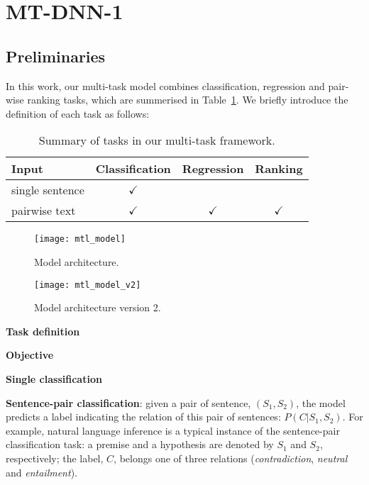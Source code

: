 \section{MT-DNN-1}
\label{sec:mt-dnn-1}

\subsection{Preliminaries}
\label{subsec:prelim}
In this work, our multi-task model combines classification, regression and pair-wise ranking tasks, which are summerised in Table~\ref{tab:task}. We briefly introduce the definition of each task as follows: 
\begin{table}[htb!]
	\begin{center}
		\begin{tabular}{@{\hskip1pt}l@{\hskip1pt}|@{\hskip1pt}c@{\hskip1pt}|@{\hskip1pt}c@{\hskip1pt}|@{\hskip1pt}c}
			\hline \bf Input &Classification&Regression &Ranking\\ \hline \hline
			single sentence &$\checkmark$&& \\
			pairwise text &$\checkmark$&$\checkmark$&$\checkmark$ \\ \hline
		\end{tabular}
	\end{center}
	\lgspace
	\caption{Summary of tasks in our multi-task framework.
	}
	\label{tab:task}
\lgspace
\end{table}
\begin{figure}[!t]
\centering
{}
{\texttt{[image: mtl\_model]}}
\caption{Model architecture.}
\label{fig:mtl_model} 
\end{figure}

\begin{figure}[!t]
\centering
{}
{\texttt{[image: mtl\_model\_v2]}}
\caption{Model architecture version 2.}
\label{fig:mtl_model_v2} 
\end{figure}

\textbf{Task definition}

\textbf{Objective}

\textbf{Single classification}

\textbf{Sentence-pair classification}: given a pair of sentence, $(S_1, S_2)$, the model predicts a label indicating the relation of this pair of sentences: $P(C|S_1, S_2)$. For example, natural language inference is a typical instance of the sentence-pair classification task: a premise and a hypothesis are denoted by $S_1$ and $S_2$, respectively; the label, $C$, belongs one of three relations (\textit{contradiction}, \textit{neutral} and \textit{entailment}). 

